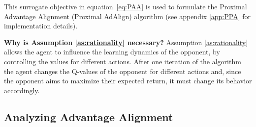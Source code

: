 \documentclass{article} \usepackage{iclr2025_conference,times}
\def\eqref#1{equation~\ref{#1}}
\begin{document}
This surrogate objective in \eqref{eq:PAA} is used to formulate the Proximal Advantage Alignment (Proximal AdAlign) algorithm (see appendix \ref{app:PPA} for implementation details).

\textbf{Why is Assumption \ref{as:rationality} necessary?} Assumption \ref{as:rationality} allows the agent to influence the learning dynamics of the opponent, by controlling the values for different actions. After one iteration of the algorithm the agent changes the Q-values of the opponent for different actions and, since the opponent aims to maximize their expected return, it must change its behavior accordingly. 

\subsection{Analyzing Advantage Alignment}
\end{document}
